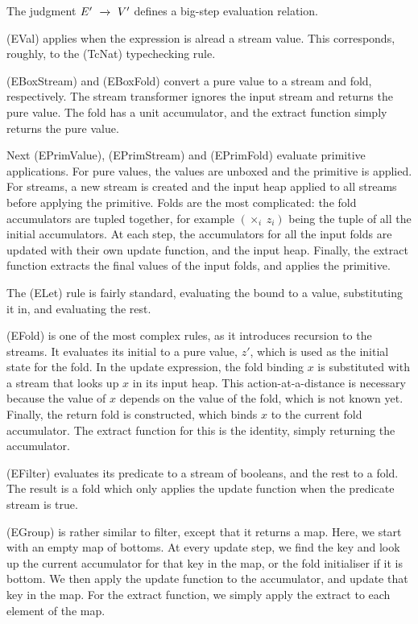 The judgment $E' ~\xrightarrow~~ V'$ defines a big-step evaluation relation.

(EVal) applies when the expression is alread a stream value.
This corresponds, roughly, to the (TcNat) typechecking rule.

(EBoxStream) and (EBoxFold) convert a pure value to a stream and fold, respectively.
The stream transformer ignores the input stream and returns the pure value.
The fold has a unit accumulator, and the extract function simply returns the pure value.

Next (EPrimValue), (EPrimStream) and (EPrimFold) evaluate primitive applications.
For pure values, the values are unboxed and the primitive is applied.
For streams, a new stream is created and the input heap applied to all streams before applying the primitive.
Folds are the most complicated: the fold accumulators are tupled together, for example $(\times_i~z_i)$ being the tuple of all the initial accumulators.
At each step, the accumulators for all the input folds are updated with their own update function, and the input heap.
Finally, the extract function extracts the final values of the input folds, and applies the primitive.

The (ELet) rule is fairly standard, evaluating the bound to a value, substituting it in, and evaluating the rest.

(EFold) is one of the most complex rules, as it introduces recursion to the streams.
It evaluates its initial to a pure value, $z'$, which is used as the initial state for the fold.
In the update expression, the fold binding $x$ is substituted with a stream that looks up $x$ in its input heap.
This action-at-a-distance is necessary because the value of $x$ depends on the value of the fold, which is not known yet.
Finally, the return fold is constructed, which binds $x$ to the current fold accumulator.
The extract function for this is the identity, simply returning the accumulator.

(EFilter) evaluates its predicate to a stream of booleans, and the rest to a fold.
The result is a fold which only applies the update function when the predicate stream is true.

(EGroup) is rather similar to filter, except that it returns a map.
Here, we start with an empty map of bottoms.
At every update step, we find the key and look up the current accumulator for that key in the map, or the fold initialiser if it is bottom.
We then apply the update function to the accumulator, and update that key in the map.
For the extract function, we simply apply the extract to each element of the map.

